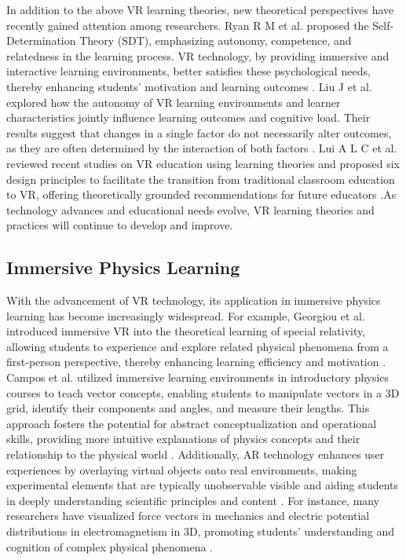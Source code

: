 \documentclass[runningheads]{llncs}
\begin{document}
In addition to the above VR learning theories, new theoretical perspectives have recently gained attention among researchers. Ryan R M et al. proposed the Self-Determination Theory (SDT), emphasizing autonomy, competence, and relatedness in the learning process. VR technology, by providing immersive and interactive learning environments, better satisfies these psychological needs, thereby enhancing students' motivation and learning outcomes \cite{ryan2024self}. Liu J et al. explored how the autonomy of VR learning environments and learner characteristics jointly influence learning outcomes and cognitive load. Their results suggest that changes in a single factor do not necessarily alter outcomes, as they are often determined by the interaction of both factors \cite{liu2024autonomy}. Lui A L C et al. reviewed recent studies on VR education using learning theories and proposed six design principles to facilitate the transition from traditional classroom education to VR, offering theoretically grounded recommendations for future educators \cite{lui2023theory}.As technology advances and educational needs evolve, VR learning theories and practices will continue to develop and improve.

\subsection{Immersive Physics Learning}
With the advancement of VR technology, its application in immersive physics learning has become increasingly widespread. For example, Georgiou et al. introduced immersive VR into the theoretical learning of special relativity, allowing students to experience and explore related physical phenomena from a first-person perspective, thereby enhancing learning efficiency and motivation \cite{georgiou2021learning}. Campos et al. utilized immersive learning environments in introductory physics courses to teach vector concepts, enabling students to manipulate vectors in a 3D grid, identify their components and angles, and measure their lengths. This approach fosters the potential for abstract conceptualization and operational skills, providing more intuitive explanations of physics concepts and their relationship to the physical world \cite{campos2022impact}. Additionally, AR technology enhances user experiences by overlaying virtual objects onto real environments, making experimental elements that are typically unobservable visible and aiding students in deeply understanding scientific principles and content \cite{pegrum2021augmented,prahani2022trend}. For instance, many researchers have visualized force vectors in mechanics and electric potential distributions in electromagnetism in 3D, promoting students' understanding and cognition of complex physical phenomena \cite{al2020effectiveness,teichrew2020augmented,ismail2019enhancing,boettcher2021using}.
\end{document}
